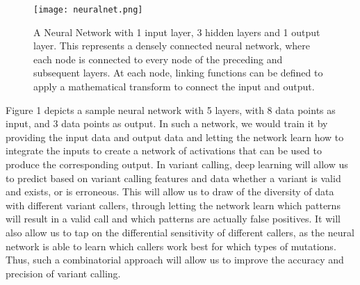 \documentclass{article}
\begin{document}
\begin{figure}[H]
\texttt{[image: neuralnet.png]}
\centering
\caption{A Neural Network with 1 input layer, 3 hidden layers and 1 output layer. This represents a densely connected neural network, where each node is connected to every node of the preceding and subsequent layers. At each node, linking functions can be defined to apply a mathematical transform to connect the input and output.}
\end{figure}
Figure 1 depicts a sample neural network with 5 layers, with 8 data points as input, and 3 data points as output. In such a network, we would train it by providing the input data and output data and letting the network learn how to integrate the inputs to create a network of activations that can be used to produce the corresponding output. In variant calling, deep learning will allow us to predict based on variant calling features and data whether a variant is valid and exists, or is erroneous. This will allow us to draw of the diversity of data with different variant callers, through letting the network learn which patterns will result in a valid call and which patterns are actually false positives. It will also allow us to tap on the differential sensitivity of different callers, as the neural network is able to learn which callers work best for which types of mutations. Thus, such a combinatorial approach will allow us to improve the accuracy and precision of variant calling.\\
\end{document}
